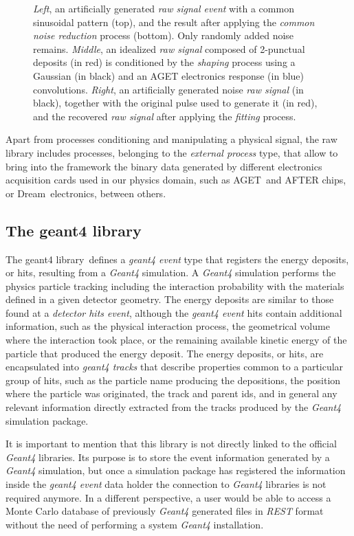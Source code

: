 \begin{figure}[htb!]
	\caption{\emph{Left}, an artificially generated \emph{raw signal event} with a common sinusoidal pattern (top), and the result after applying the \emph{common noise reduction} process (bottom). Only randomly added noise remains. \emph{Middle}, an idealized \emph{raw signal} composed of 2-punctual deposits (in red) is conditioned by the \emph{shaping} process using a Gaussian (in black) and an AGET electronics response (in blue) convolutions. \emph{Right}, an artificially generated noise \emph{raw signal} (in black), together with the original pulse used to generate it (in red), and the recovered \emph{raw signal} after applying the \emph{fitting} process.}\label{fig:rawlib}
\end{figure}

Apart from processes conditioning and manipulating a physical signal, the raw library includes processes, belonging to the \emph{external process} type, that allow to bring into the framework the binary data generated by different electronics acquisition cards used in our physics domain, such as AGET\,\cite{6154095} and AFTER chips, or Dream\,\cite{Dream} electronics, between others.

\subsection{The geant4 library}\label{sc:geant4lib}

The geant4 library\,\cite{REST_Geant4_Git} defines a \emph{geant4 event} type that registers the energy deposits, or hits, resulting from a \emph{Geant4} simulation. A \emph{Geant4} simulation performs the physics particle tracking including the interaction probability with the materials defined in a given detector geometry. The energy deposits are similar to those found at a \emph{detector hits event}, although the \emph{geant4 event} hits contain additional information, such as the physical interaction process, the geometrical volume where the interaction took place, or the remaining available kinetic energy of the particle that produced the energy deposit. The energy deposits, or hits, are encapsulated into \emph{geant4 tracks} that describe properties common to a particular group of hits, such as the particle name producing the depositions, the position where the particle was originated, the track and parent ids, and in general any relevant information directly extracted from the tracks produced by the \emph{Geant4} simulation package.

It is important to mention that this library is not directly linked to the official \emph{Geant4} libraries. Its purpose is to store the event information generated by a \emph{Geant4} simulation, but once a simulation package has registered the information inside the \emph{geant4 event} data holder the connection to \emph{Geant4} libraries is not required anymore. In a different perspective, a user would be able to access a Monte Carlo database of previously \emph{Geant4} generated files in \emph{REST} format without the need of performing a system \emph{Geant4} installation.

